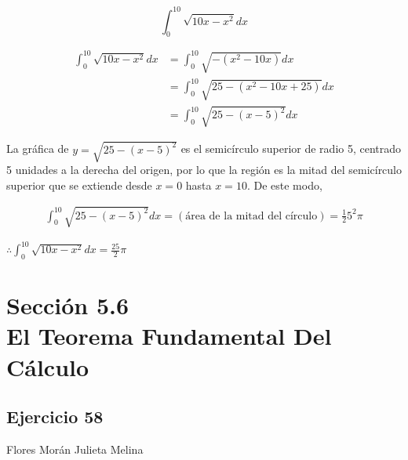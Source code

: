 \documentclass[12pt]{article}
\begin{document}
\[
\int_{0}^{10} \sqrt{10x-x^2}dx
\]

\begin{align*}
  \int_{0}^{10} \sqrt{10x-x^2}dx
  &= \int_{0}^{10} \sqrt{-(x^2-10x)}dx \\
  &= \int_{0}^{10} \sqrt{25-(x^2-10x+25)}dx \\
  &= \int_{0}^{10} \sqrt{25-(x-5)^2}dx 
\end{align*}

La gráfica de $y=\sqrt{25-(x-5)^2}$ es el semicírculo superior de radio 5, centrado 5 unidades a la derecha del origen, por lo que la región es la mitad del semicírculo superior que se extiende desde $x = 0$ hasta $x = 10$. De este modo,

\begin{align*}
  \int_{0}^{10} \sqrt{25-(x-5)^2}dx = (\text{área de la mitad del círculo}) = \frac{1}{2}5^2\pi
\end{align*}

$\therefore \int_{0}^{10} \sqrt{10x-x^2}dx = \frac{25}{2}\pi$
    

\section{Sección 5.6 \\ El Teorema Fundamental Del Cálculo}
\subsection{Ejercicio 58} Flores Morán Julieta Melina \\
\end{document}
